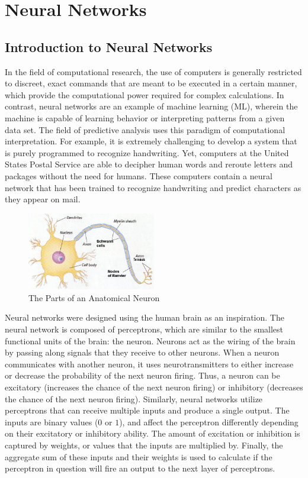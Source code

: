 \chapter{Neural Networks}
\section{Introduction to Neural Networks}

In the field of computational research, the use of computers is generally restricted to discreet, exact commands that are meant to be executed in a certain manner, which  provide the computational power required for complex calculations.
In contrast, neural networks are an example of machine learning (ML), wherein the machine is capable of learning behavior or interpreting patterns from a given data set.
The field of predictive analysis uses this paradigm of computational interpretation.
For example, it is extremely challenging to develop a system that is purely programmed to recognize handwriting.
Yet, computers at the United States Postal Service are able to decipher human words and reroute letters and packages without the need for humans.
These computers contain a neural network that has been trained to recognize handwriting and predict characters as they appear on mail. \cite{nielsen} 

\begin{figure}[htbp!]
   \centering
   \includegraphics[width=0.5\textwidth]{pictures/NeuralNetworks/neuron.jpg} 
   \caption{The Parts of an Anatomical Neuron}
   \label{fig:neuron}
\end{figure}

Neural networks were designed using the human brain as an inspiration.
The neural network is composed of perceptrons, which are similar to the smallest functional units of the brain: the neuron.
Neurons act as the wiring of the brain by passing along signals that they receive to other neurons.
When a neuron communicates with another neuron, it uses neurotransmitters to either increase or decrease the probability of the next neuron firing.
Thus, a neuron can be excitatory (increases the chance of the next neuron firing) or inhibitory (decreases the chance of the next neuron firing).
Similarly, neural networks utilize perceptrons that can receive multiple inputs and produce a single output.
The inputs are binary values ($0$ or $1$), and affect the perceptron differently depending on their excitatory or inhibitory ability.
The amount of excitation or inhibition is captured by weights, or values that the inputs are multiplied by.
Finally, the aggregate sum of these inputs and their weights is used to calculate if the perceptron in question will fire an output to the next layer of perceptrons. 

